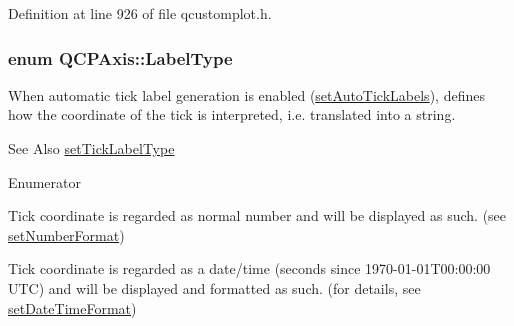 Definition at line 926 of file qcustomplot.\-h.

\hypertarget{class_q_c_p_axis_a4a7da0166f755f5abac23b765d184cad}{
\subsubsection[{Label\-Type}]{\setlength{\rightskip}{0pt plus 5cm}enum {\bf Q\-C\-P\-Axis\-::\-Label\-Type}}}\label{class_q_c_p_axis_a4a7da0166f755f5abac23b765d184cad}
When automatic tick label generation is enabled (\hyperlink{class_q_c_p_axis_aaa47e3a6bac0c20d4beb9028f01bc1a1}{set\-Auto\-Tick\-Labels}), defines how the coordinate of the tick is interpreted, i.\-e. translated into a string.

\begin{DoxySeeAlso}{See Also}
\hyperlink{class_q_c_p_axis_a54f24f5ce8feea25209388a863d7e448}{set\-Tick\-Label\-Type} 
\end{DoxySeeAlso}
\begin{Desc}
\item[Enumerator]\par
\begin{description}
\item[{\em 
\hypertarget{class_q_c_p_axis_a4a7da0166f755f5abac23b765d184cada7f1eacf3b73adaefd334bea04e094b7e}{lt\-Number}\label{class_q_c_p_axis_a4a7da0166f755f5abac23b765d184cada7f1eacf3b73adaefd334bea04e094b7e}
}]Tick coordinate is regarded as normal number and will be displayed as such. (see \hyperlink{class_q_c_p_axis_ae585a54dc2aac662e90a2ca82f002590}{set\-Number\-Format}) \item[{\em 
\hypertarget{class_q_c_p_axis_a4a7da0166f755f5abac23b765d184cadafc70594a9d877124dd11ccc187d4ac52}{lt\-Date\-Time}\label{class_q_c_p_axis_a4a7da0166f755f5abac23b765d184cadafc70594a9d877124dd11ccc187d4ac52}
}]Tick coordinate is regarded as a date/time (seconds since 1970-\/01-\/01\-T00\-:00\-:00 U\-T\-C) and will be displayed and formatted as such. (for details, see \hyperlink{class_q_c_p_axis_a2ee0191daa03524a682113e63e05f7a7}{set\-Date\-Time\-Format}) \end{description}
\end{Desc}



